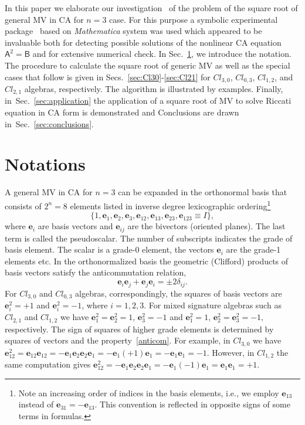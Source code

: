 \documentclass{birkjour}
\newcommand{\e}[1]{\mathbf{e}_{#1}} %
\newcommand{\cl}[2]{\ensuremath{\mathit{Cl}_{#1,#2}}}
\def\A{\mathsf{A}}
\def\B{\mathsf{B}}
\def\e#1{\mathbf{e}_{#1}} %
\begin{document}
In this paper we elaborate our investigation~\cite{Dargys2019} of
the problem of the square root of general MV in CA for $n=3$ case.
For this purpose a symbolic experimental
package~\cite{AcusDargys2017} based on {\it Mathematica} system
was used which appeared to be invaluable both for detecting
possible solutions of the nonlinear CA equation $\A^2=\B$ and for
extensive numerical check. In Sec.~\ref{sec:notations}, we
introduce the notation.  The procedure to calculate the square
root of generic MV as well as the special cases that follow is
given in Secs.~\ref{sec:Cl30}-\ref{sec:Cl21} for \cl{3}{0},
\cl{0}{3}, \cl{1}{2}, and \cl{2}{1} algebras, respectively. The
algorithm  is illustrated by examples. Finally,
in~Sec.~\ref{sec:application} the application of a square root of
MV to solve Riccati equation in CA form is demonstrated and
Conclusions are drawn in~Sec.~\ref{sec:conclusions}.


\section{Notations}\label{sec:notations}
A general MV in CA for $n=3$ can be expanded in the orthonormal
basis that consists of $2^{n}=8$ elements listed in inverse degree
lexicographic ordering\footnote{\label{note1}Note an increasing
order of indices in the basis elements, i.e., we employ $\e{13}$
instead of $\e{31}=-\e{13}$. This convention is reflected in
opposite signs of some terms in formulas.}
\begin{equation}\label{basisDim3}
\{1,\e{1},\e{2},\e{3},\e{12},\e{13},\e{23},\e{123}\equiv I\},
\end{equation}
where $\e{i}$ are basis vectors and $\e{ij}$ are the bivectors
(oriented planes). The last term is called the pseudoscalar. The
number of subscripts indicates the grade of basis element. The
scalar is a grade-0 element, the vectors $\e{i}$ are the grade-1
elements etc. In the orthonormalized basis the geometric (Clifford) products of basis vectors satisfy the anticommutation relation,
 \begin{equation}\label{anticom}
 \e{i}\e{j}+\e{j}\e{i}=\pm 2\delta_{ij}.
 \end{equation}
 For \cl{3}{0}
and \cl{0}{3} algebras, correspondingly, the squares of basis
vectors are $\e{i}^2=+1$ and $\e{i}^2=-1$, where $i=1,2,3$. For
mixed signature algebras such as  \cl{2}{1} and \cl{1}{2} we have
$\e{1}^2=\e{2}^2=1$, $\e{3}^2=-1$ and $\e{1}^2=1$,
$\e{2}^2=\e{3}^2=-1$, respectively. The sign of squares of higher
grade elements is determined by squares of vectors and the
property~\eqref{anticom}. For example, in \cl{3}{0} we have
$\e{12}^2=\e{12}\e{12}=-\e{1}\e{2}\e{2}\e{1}=-\e{1}(+1)\e{1}=-\e{1}\e{1}=-1$.
However, in \cl{1}{2} the same computation gives
$\e{12}^2=-\e{1}\e{2}\e{2}\e{1}=-\e{1}(-1)\e{1}=\e{1}\e{1}=+1$.
\end{document}
